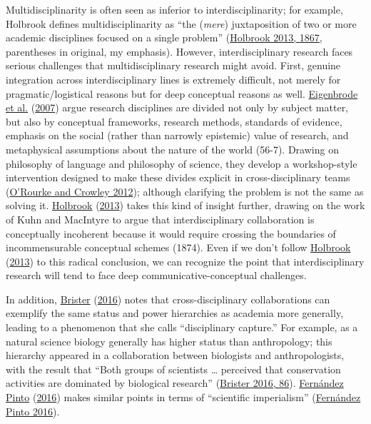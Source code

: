 \documentclass[
  11pt,
]{article}
\begin{document}
Multidisciplinarity is often seen as inferior to interdisciplinarity; for example, Holbrook defines multidisciplinarity as ``the (\emph{mere}) juxtaposition of two or more academic disciplines focused on a single problem'' (\protect\hyperlink{ref-HolbrookWhatInterdisciplinaryCommunication2013}{Holbrook 2013, 1867}, parentheses in original, my emphasis). However, interdisciplinary research faces serious challenges that multidisciplinary research might avoid. First, genuine integration across interdisciplinary lines is extremely difficult, not merely for pragmatic/logistical reasons but for deep conceptual reasons as well. \protect\hyperlink{ref-EigenbrodeEmployingPhilosophicalDialogue2007}{Eigenbrode et al.} (\protect\hyperlink{ref-EigenbrodeEmployingPhilosophicalDialogue2007}{2007}) argue research disciplines are divided not only by subject matter, but also by conceptual frameworks, research methods, standards of evidence, emphasis on the social (rather than narrowly epistemic) value of research, and metaphysical assumptions about the nature of the world (56-7). Drawing on philosophy of language and philosophy of science, they develop a workshop-style intervention designed to make these divides explicit in cross-disciplinary teams (\protect\hyperlink{ref-ORourkePhilosophicalInterventionCrossdisciplinary2012}{O'Rourke and Crowley 2012}); although clarifying the problem is not the same as solving it. \protect\hyperlink{ref-HolbrookWhatInterdisciplinaryCommunication2013}{Holbrook} (\protect\hyperlink{ref-HolbrookWhatInterdisciplinaryCommunication2013}{2013}) takes this kind of insight further, drawing on the work of Kuhn and MacIntyre to argue that interdisciplinary collaboration is conceptually incoherent because it would require crossing the boundaries of incommensurable conceptual schemes (1874). Even if we don't follow \protect\hyperlink{ref-HolbrookWhatInterdisciplinaryCommunication2013}{Holbrook} (\protect\hyperlink{ref-HolbrookWhatInterdisciplinaryCommunication2013}{2013}) to this radical conclusion, we can recognize the point that interdisciplinary research will tend to face deep communicative-conceptual challenges.

In addition, \protect\hyperlink{ref-BristerDisciplinaryCaptureEpistemological2016}{Brister} (\protect\hyperlink{ref-BristerDisciplinaryCaptureEpistemological2016}{2016}) notes that cross-disciplinary collaborations can exemplify the same status and power hierarchies as academia more generally, leading to a phenomenon that she calls ``disciplinary capture.'' For example, as a natural science biology generally has higher status than anthropology; this hierarchy appeared in a collaboration between biologists and anthropologists, with the result that ``Both groups of scientists \ldots{} perceived that conservation activities are dominated by biological research'' (\protect\hyperlink{ref-BristerDisciplinaryCaptureEpistemological2016}{Brister 2016, 86}). \protect\hyperlink{ref-FernandezPintoEconomicsImperialismSocial2016}{Fernández Pinto} (\protect\hyperlink{ref-FernandezPintoEconomicsImperialismSocial2016}{2016}) makes similar points in terms of ``scientific imperialism'' (\protect\hyperlink{ref-FernandezPintoEconomicsImperialismSocial2016}{Fernández Pinto 2016}).
\end{document}
